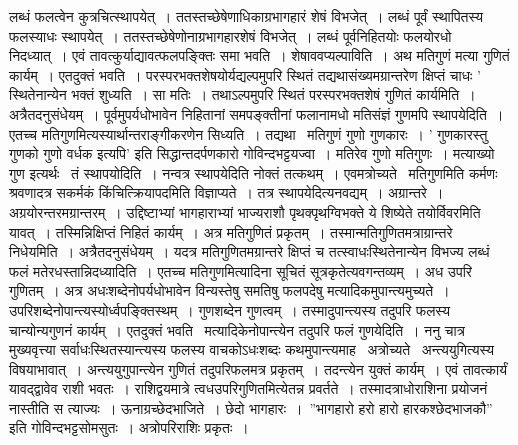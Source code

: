 \documentclass[11pt, openany]{book}
\begin{document}
\noindent
लब्धं फलत्वेन कुत्रचित्स्थापयेत्~। ततस्तच्छेषेणाधिकाग्रभागहारं शेषं विभजेत्~। लब्धं पूर्वं स्थापितस्य फलस्याधः स्थापयेत्~। ततस्तच्छेषेणोनाग्रभागहारशेषं विभजेत्~। लब्धं पूर्वनिहितयोः फलयोरधो निदध्यात्~। एवं तावत्कुर्याद्यावत्फलपङ्क्तिः समा भवति~। शेषाववप्यल्पाविति~। अथ मतिगुणं मत्या गुणितं कार्यम्~। एतदुक्तं भवति~। परस्परभक्तशेषयोर्यद्यल्पमुपरि स्थितं तद्यथासंख्यमग्रान्तरेण क्षिप्तं चाधः ' स्थितेनान्येन भक्तं शुध्यति~। सा मतिः~। तथाऽल्पमुपरि स्थितं परस्परभक्तशेषं गुणितं कार्यमिति~। अत्रैतदनुसंधेयम्~। पूर्वमुपर्यधोभावेन निहितानां समपङ्क्तीनां फलानामधो मतिसंज्ञं गुणमपि स्थापयेदिति~। एतच्च मतिगुणमित्यस्यार्थान्तराङ्गीकरणेन सिध्यति~। तद्यथा \textendash \ मतिगुणं गुणो गुणकारः~। ' गुणकारस्तु गुणको गुणो वर्धक इत्यपि' इति सिद्धान्तदर्पणकारो गोविन्दभट्टयज्वा~। मतिरेव गुणो मतिगुणः~। मत्याख्यो गुण इत्यर्थः \textendash\  तं स्थापयोदिति~। नन्वत्र स्थापयेदिति नोक्तं तत्कथम्~। एवमत्रोच्यते \textendash\  मतिगुणमिति कर्मणः श्रवणादत्र सकर्मकं किंचित्क्रियापदमिति विज्ञाप्यते~। तत्र स्थापयेदित्यनवद्यम्~। अग्रान्तरे~। अग्रयोरन्तरमग्रान्तरम्~। उद्दिष्टाभ्यां भागहाराभ्यां भाज्यराशौ पृथक्पृथग्विभक्ते ये शिष्येते तयोर्विवरमिति यावत्~। तस्मिन्निक्षिप्तं निहितं कार्यम्~। अत्र मतिगुणितं प्रकृतम्~। तस्मान्मतिगुणितमत्राग्रान्तरे निधेयमिति~। अत्रैतदनुसंधेयम्~। यदत्र मतिगुणितमग्रान्तरे क्षिप्तं च तत्स्वाधःस्थितेनान्येन विभज्य लब्धं फलं मतेरधस्तान्निदध्यादिति~। एतच्च मतिगुणमित्यादिना सूचितं सूत्रकृतेत्यवगन्तव्यम्~। अध उपरि गुणितम्~। अत्र अधःशब्देनोपर्यधोभावेन विन्यस्तेषु समतिषु फलपदेषु मत्यादिकमुपान्त्यमुच्यते~। उपरिशब्देनोपान्त्यस्योर्ध्वपङ्क्तिस्थम्~। गुणशब्देन गुणत्वम्~। तस्मादुपान्त्यस्य तदुपरि फलस्य चान्योन्यगुणनं कार्यम्~। एतदुक्तं भवति \textendash\ मत्यादिकेनोपान्त्येन तदुपरि फलं गुणयेदिति~। ननु चात्र मुख्यवृत्त्या सर्वाधःस्थितस्यान्त्यस्य फलस्य वाचकोऽधःशब्दः कथमुपान्त्यमाह \textendash\ अत्रोच्यते \textendash\ अन्त्ययुगित्यस्य विषयाभावात्~। अन्त्ययुगुपान्त्येन गुणितं तदुपरिफलमत्र प्रकृतम्~। तदन्त्येन युक्तं कार्यम्~। एवं तावत्कार्यं यावद्द्वावेव राशी भवतः~। राशिद्वयमात्रे त्वधउपरिगुणितमित्येतन्न प्रवर्तते~। तस्मादत्राधोराशिना प्रयोजनं नास्तीति स त्याज्यः~। ऊनाग्रच्छेदभाजिते~। छेदो भागहारः~।~''भागहारो हरो हारो हारकश्छेदभाजकौ'' इति गोविन्दभट्टसोमसुतः~। अत्रोपरिराशिः प्रकृतः~।

\newpage
\thispagestyle{fancy}
\fancyhf{}
\end{document}
